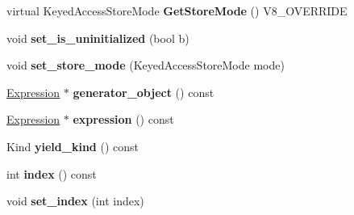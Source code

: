 \begin{DoxyCompactItemize}
\item 
\hypertarget{classv8_1_1internal_1_1_v8___f_i_n_a_l_af32afe1cd92df5e1926837238564755d}{}virtual Keyed\+Access\+Store\+Mode {\bfseries Get\+Store\+Mode} () V8\+\_\+\+O\+V\+E\+R\+R\+I\+D\+E\label{classv8_1_1internal_1_1_v8___f_i_n_a_l_af32afe1cd92df5e1926837238564755d}

\item 
\hypertarget{classv8_1_1internal_1_1_v8___f_i_n_a_l_a13ab518c2faa2e71e0198b786abcc0e6}{}void {\bfseries set\+\_\+is\+\_\+uninitialized} (bool b)\label{classv8_1_1internal_1_1_v8___f_i_n_a_l_a13ab518c2faa2e71e0198b786abcc0e6}

\item 
\hypertarget{classv8_1_1internal_1_1_v8___f_i_n_a_l_ae9fcde66d4e35a5d2dab7a657d44bcf3}{}void {\bfseries set\+\_\+store\+\_\+mode} (Keyed\+Access\+Store\+Mode mode)\label{classv8_1_1internal_1_1_v8___f_i_n_a_l_ae9fcde66d4e35a5d2dab7a657d44bcf3}

\item 
\hypertarget{classv8_1_1internal_1_1_v8___f_i_n_a_l_a51036bcf25ead383026397c8d19d12b0}{}\hyperlink{classv8_1_1internal_1_1_expression}{Expression} $\ast$ {\bfseries generator\+\_\+object} () const \label{classv8_1_1internal_1_1_v8___f_i_n_a_l_a51036bcf25ead383026397c8d19d12b0}

\item 
\hypertarget{classv8_1_1internal_1_1_v8___f_i_n_a_l_adc5b6319eb3831282cfa4861dc34dc4e}{}\hyperlink{classv8_1_1internal_1_1_expression}{Expression} $\ast$ {\bfseries expression} () const \label{classv8_1_1internal_1_1_v8___f_i_n_a_l_adc5b6319eb3831282cfa4861dc34dc4e}

\item 
\hypertarget{classv8_1_1internal_1_1_v8___f_i_n_a_l_a29acd7b6d7f6d83a77c0de995ee1922f}{}Kind {\bfseries yield\+\_\+kind} () const \label{classv8_1_1internal_1_1_v8___f_i_n_a_l_a29acd7b6d7f6d83a77c0de995ee1922f}

\item 
\hypertarget{classv8_1_1internal_1_1_v8___f_i_n_a_l_a3ba43be9bf0c0469f6826154100119b3}{}int {\bfseries index} () const \label{classv8_1_1internal_1_1_v8___f_i_n_a_l_a3ba43be9bf0c0469f6826154100119b3}

\item 
\hypertarget{classv8_1_1internal_1_1_v8___f_i_n_a_l_ac6093062c3e7e08953669f994a42a671}{}void {\bfseries set\+\_\+index} (int index)\label{classv8_1_1internal_1_1_v8___f_i_n_a_l_ac6093062c3e7e08953669f994a42a671}


\end{DoxyCompactItemize}
